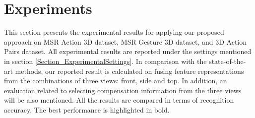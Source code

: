 \documentclass[final,3p,times,twocolumn]{elsarticle}
\begin{document}
\begin{table}[H]
	\begin{center}
	\end{center}
	\caption{\label{lbl:3ActionSubsets}The three action subsets used in the experiments}
\end{table}

\section{Experiments}
\label{Section_Experiments}
This section presents the experimental results for applying our proposed approach on MSR Action 3D dataset, MSR Gesture 3D dataset, and 3D Action Pairs dataset.
All experimental results are reported under the settings mentioned in section \ref{Section_ExperimentalSettings}.
In comparison with the state-of-the-art methods, our reported result is calculated on fusing feature representations from the combinations of three views: front, side and top.
In addition, an evaluation related to selecting compensation information from the three views will be also mentioned.
All the results are compared in terms of recognition accuracy.
The best performance is highlighted in bold.
\end{document}
